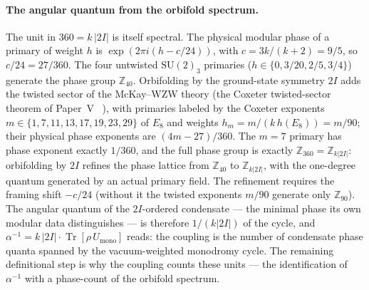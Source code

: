 \documentclass[11pt,a4paper]{article}
\theoremstyle{definition}
\theoremstyle{remark}
\newcommand{\aInv}{\alpha^{-1}}
\begin{document}
\paragraph{The angular quantum from the orbifold spectrum.}
The unit in $360 = k\,|2I|$ is itself spectral. The physical modular
phase of a primary of weight $h$ is $\exp(2\pi i(h - c/24))$, with
$c = 3k/(k+2) = 9/5$, so $c/24 = 27/360$. The four untwisted
$\mathrm{SU}(2)_3$ primaries ($h \in \{0, 3/20, 2/5, 3/4\}$)
generate the phase group $\mathbb{Z}_{40}$. Orbifolding by the
ground-state symmetry $2I$ adds the twisted sector of the McKay--WZW
theory (the Coxeter twisted-sector theorem of
Paper~V~\cite{Paper5}%
), with primaries labeled by the Coxeter exponents
$m \in \{1,7,11,13,17,19,23,29\}$ of $E_8$ and weights
$h_m = m/(k\,h(E_8)) = m/90$; their physical phase exponents are
$(4m-27)/360$. The $m=7$ primary has phase exponent exactly $1/360$,
and the full phase group is exactly $\mathbb{Z}_{360} =
\mathbb{Z}_{k|2I|}$: orbifolding by $2I$ refines the phase lattice
from $\mathbb{Z}_{40}$ to $\mathbb{Z}_{k|2I|}$, with the one-degree
quantum generated by an actual primary field. The refinement requires
the framing shift $-c/24$ (without it the twisted exponents $m/90$
generate only $\mathbb{Z}_{90}$). The angular quantum of the
$2I$-ordered condensate --- the minimal phase its own modular data
distinguishes --- is therefore $1/(k|2I|)$ of the cycle, and
$\aInv = k\,|2I| \cdot \operatorname{Tr}[\rho\,U_{\mathrm{mono}}]$
reads: the coupling is the number of condensate phase quanta spanned
by the vacuum-weighted monodromy cycle. The remaining definitional
step is why the coupling counts these units --- the identification of
$\aInv$ with a phase-count of the orbifold spectrum.
\end{document}
